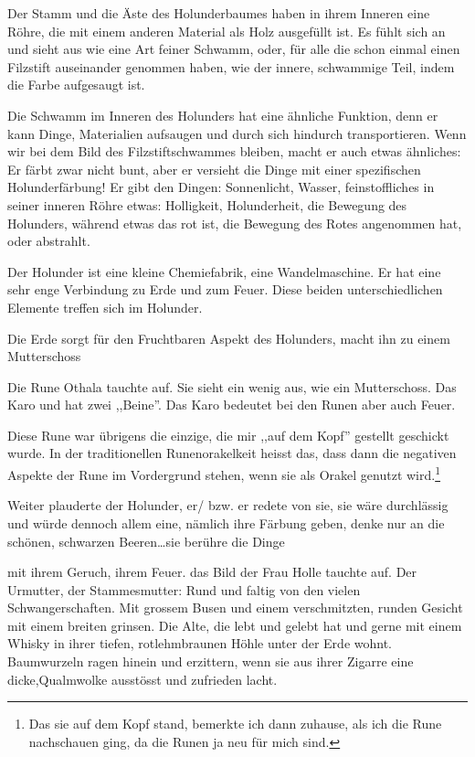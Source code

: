 \documentclass[11pt,titlepage,a5paper]{book}
\begin{document}
Der Stamm und die Äste des Holunderbaumes haben in ihrem Inneren eine Röhre, die mit einem anderen Material als Holz ausgefüllt ist. Es fühlt sich an und sieht aus wie eine Art feiner Schwamm, oder, für alle die schon einmal einen Filzstift auseinander genommen haben, wie der innere, schwammige Teil, indem die Farbe aufgesaugt ist.

Die Schwamm im Inneren des Holunders hat eine ähnliche Funktion, denn er kann Dinge, Materialien aufsaugen und durch sich hindurch transportieren. Wenn wir bei dem Bild des Filzstiftschwammes bleiben, macht er auch etwas ähnliches: Er färbt zwar nicht bunt, aber er versieht die Dinge mit einer spezifischen Holunderfärbung! Er gibt den Dingen: Sonnenlicht, Wasser, feinstoffliches in seiner inneren Röhre etwas: Holligkeit, Holunderheit, die Bewegung des Holunders, während etwas das rot ist, die Bewegung des Rotes angenommen hat, oder abstrahlt.

Der Holunder ist eine kleine Chemiefabrik, eine Wandelmaschine. Er hat eine sehr enge Verbindung zu Erde und zum Feuer. Diese beiden unterschiedlichen Elemente treffen sich im Holunder.

Die Erde sorgt für den Fruchtbaren Aspekt des Holunders, macht ihn zu einem Mutterschoss

Die Rune Othala  tauchte auf. Sie sieht ein wenig aus, wie ein Mutterschoss. Das Karo und hat zwei ,,Beine''. Das Karo bedeutet bei den Runen aber auch Feuer. 

Diese Rune war übrigens die einzige, die mir ,,auf dem Kopf'' gestellt geschickt wurde. In der traditionellen Runenorakelkeit heisst das, dass dann die negativen Aspekte der Rune im Vordergrund stehen, wenn sie als Orakel genutzt wird.\footnote{Das sie auf dem Kopf stand, bemerkte ich dann zuhause, als ich die Rune nachschauen ging, da die Runen ja neu für mich sind.}

Weiter plauderte der Holunder, er/ bzw. er redete von sie, sie wäre durchlässig und würde dennoch allem eine, nämlich ihre Färbung geben, denke nur an die schönen, schwarzen Beeren\dots sie berühre die Dinge

mit ihrem Geruch, ihrem Feuer. das Bild der Frau Holle tauchte auf. Der Urmutter, der Stammesmutter: Rund und faltig von den vielen Schwangerschaften. Mit grossem Busen und einem verschmitzten, runden Gesicht mit einem breiten grinsen. Die Alte, die lebt und gelebt hat und gerne mit einem Whisky in ihrer tiefen, rotlehmbraunen Höhle unter der Erde wohnt. Baumwurzeln ragen hinein und erzittern, wenn sie aus ihrer Zigarre eine dicke,Qualmwolke ausstösst und zufrieden lacht.
\end{document}
